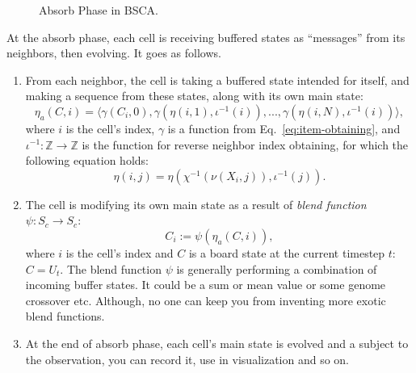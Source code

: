 \documentclass[a4paper,12pt,tikz,UTF8]{article}
\begin{document}
\begin{figure}[H]
      \caption{Absorb Phase in BSCA.}
      \label{fig:absorb-phase}
    \end{figure}

    At the absorb phase, each cell is receiving buffered states as ``messages'' from its neighbors, then evolving. It goes as follows.
    \begin{enumerate}
      \item 
        From each neighbor, the cell is taking a buffered state intended for itself, and making a sequence from these states, along with its own main state:
        \begin{equation}
          \label{eq:neighbors-main-sequence}
          \eta_a(C, i) = \langle \gamma({C_i}, 0), \gamma(\eta(i, 1), \iota^{-1}(i)), ..., \gamma(\eta(i, N), \iota^{-1}(i)) \rangle,
        \end{equation}
        where $i$ is the cell's index, $\gamma$ is a function from Eq.~\ref{eq:item-obtaining}, and $\iota^{-1}: \mathbb{Z} \to \mathbb{Z}$ is the function for reverse neighbor index obtaining, for which the following equation holds:
        \begin{equation}
          \eta(i, j) = \eta(\chi^{-1}(\nu(X_i, j)), \iota^{-1}(j)).
        \end{equation}
      \item
        The cell is modifying its own main state as a result of \textit{blend function} $\psi: S_c \to S_c$:
        \begin{equation}
          C_i := \psi(\eta_a(C, i)),
        \end{equation}
        where $i$ is the cell's index and $C$ is a board state at the current timestep $t$: $C = U_t$. The blend function $\psi$ is generally performing a combination of incoming buffer states. It could be a sum or mean value or some genome crossover etc. Although, no one can keep you from inventing more exotic blend functions.
      \item
        At the end of absorb phase, each cell's main state is evolved and a subject to the observation, you can record it, use in visualization and so on.
    \end{enumerate}
\end{document}
